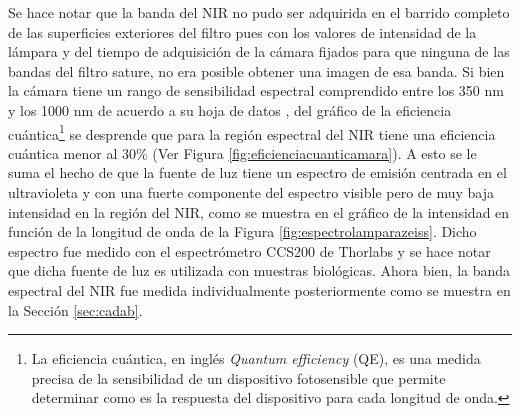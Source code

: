 Se hace notar que la banda del NIR no pudo ser adquirida en el barrido completo de las superficies exteriores del filtro pues con los valores de intensidad de la lámpara y del tiempo de adquisición de la cámara fijados para que ninguna de las bandas del filtro sature, no era posible obtener una imagen de esa banda. Si bien la cámara tiene un rango de sensibilidad espectral comprendido entre los 350 nm y los 1000 nm de acuerdo a su hoja de datos \cite{axiozeiss}, del gráfico de la eficiencia cuántica\footnote{La eficiencia cuántica, en inglés \textit{Quantum efficiency} (QE), es una medida precisa de la sensibilidad de un dispositivo fotosensible que permite determinar como es la respuesta del dispositivo para cada longitud de onda.} se desprende que para la región espectral del NIR tiene una eficiencia cuántica menor al 30\% (Ver Figura \ref{fig:eficienciacuanticamara}). A esto se le suma el hecho de que la fuente de luz tiene un espectro de emisión centrada en el ultravioleta y con una fuerte componente del espectro visible pero de muy baja intensidad en la región del NIR, como se muestra en el gráfico de la intensidad en función de la longitud de onda de la Figura \ref{fig:espectrolamparazeiss}. Dicho espectro fue medido con el espectrómetro CCS200 de Thorlabs y se hace notar que dicha fuente de luz es utilizada con muestras biológicas. Ahora bien, la banda espectral del NIR fue medida individualmente posteriormente como se muestra en la Sección \ref{sec:cadab}.

